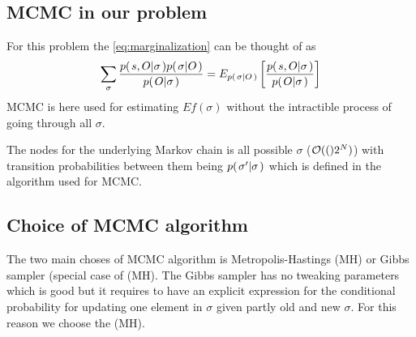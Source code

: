 \documentclass[a4paper,11pt]{kth-mag}
\begin{document}
           \subsection{MCMC in our problem} 
                For this problem the \eqref{eq:marginalization} can be thought of as
                \begin{equation}
                    \sum\limits_\sigma
                    \frac{
                        p{(\left. s,O \middle\vert \sigma \right.)}p{(\left. \sigma \middle\vert O \right.)}
                    }{
                        p{(\left. O \middle\vert \sigma \right.)}
                    }
                    = E_{p{(\left. \sigma \middle\vert O \right.)}}\left[{
                        \frac{
                            p{(\left. s,O \middle\vert \sigma \right.)}
                        }{
                            p{(\left. O \middle\vert \sigma \right.)}
                        }
                    }\right]
                \end{equation}
                MCMC is here used for estimating $E{f(\sigma)}$ without the intractible 
                process of going through all $\sigma$.
               
                The nodes for the underlying Markov chain is all possible 
                $\sigma$ ($\mathcal{O}{\left((\right)}2^N)$) 
                with transition probabilities between them being
                $p{(\left. \sigma' \middle\vert \sigma \right.)}$ which is defined in the algorithm 
                used for MCMC.

            \subsection{Choice of MCMC algorithm}
                The two main choses of MCMC algorithm is Metropolis-Hastings (MH) 
                or Gibbs sampler (special case of (MH).
                The Gibbs sampler has no tweaking parameters which is good but it 
                requires to have an explicit expression for the conditional 
                probability for updating one element in $\sigma$ given partly 
                old and new $\sigma$. For this reason we choose the (MH).
                
\end{document}
